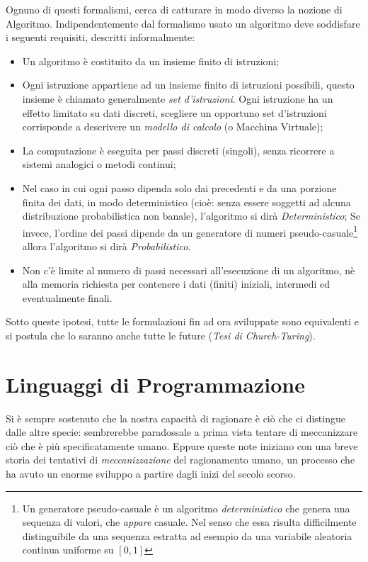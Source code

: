 Ognuno di questi formalismi, cerca di catturare in modo diverso la nozione di Algoritmo.
Indipendentemente dal formalismo usato un algoritmo deve soddisfare i seguenti requisiti, descritti informalmente:

\begin{itemize}
\item Un algoritmo è costituito da un insieme finito di istruzioni;
\item Ogni istruzione appartiene ad un insieme finito di istruzioni possibili, questo insieme è chiamato generalmente \emph{set d'istruzioni}. Ogni istruzione ha un effetto limitato su dati discreti, scegliere un opportuno set d'istruzioni corrisponde a   descrivere un \emph{modello di calcolo} (o Macchina Virtuale);
\item La computazione è eseguita per passi discreti (singoli), senza ricorrere a sistemi analogici o metodi continui;
\item Nel caso in cui ogni passo dipenda solo dai precedenti e da una porzione finita dei dati, in modo deterministico (cioè: senza essere soggetti ad alcuna distribuzione probabilistica non banale), l'algoritmo si dirà \emph{Deterministico}; Se invece, l'ordine dei passi dipende da un generatore di numeri pseudo-casuale\footnote{Un generatore pseudo-casuale è un algoritmo \emph{deterministico} che genera una sequenza di valori, che \emph{appare} casuale. Nel senso che essa risulta difficilmente distinguibile da una sequenza estratta ad esempio da una variabile aleatoria continua uniforme su $[0,1]$}  allora l'algoritmo si dirà \emph{Probabilistico}.
\item Non c’è limite al numero di passi necessari all’esecuzione di un algoritmo, nè alla memoria richiesta per contenere i dati (finiti) iniziali, intermedi ed eventualmente finali.
\end{itemize}

Sotto queste ipotesi, tutte le formulazioni fin ad ora sviluppate sono equivalenti e si postula che lo saranno anche tutte le future (\emph{Tesi di Church-Turing}).


\section{Linguaggi di Programmazione}

Si è sempre sostenuto che la nostra capacità di ragionare è ciò che ci distingue dalle altre specie: sembrerebbe paradossale a prima vista tentare di meccanizzare ciò che è più specificatamente umano. Eppure queste note iniziano con una breve storia dei tentativi di \emph{meccanizzazione} del ragionamento umano, un processo che ha avuto un enorme sviluppo a partire dagli inizi del secolo scorso.

